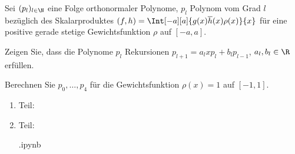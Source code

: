 
\begin{exercise}

Sei $(p_l)_{l \in \N}$ eine Folge orthonormaler Polynome, $p_l$ Polynom vom Grad $l$ bezüglich des Skalarproduktes $(f, h) = \Int[-a][a]{g(x) \overline h(x) \rho(x)}{x}$ für eine positive gerade stetige Gewichtsfunktion $\rho$ auf $[-a, a]$.

Zeigen Sie, dass die Polynome $p_l$ Rekursionen $p_{l+1} = a_l x p_l + b_l p_{l-1}$, $a_l, b_l \in \R$ erfüllen.

Berechnen Sie $p_0, \dots, p_4$ für die Gewichtsfunktion $\rho(x) = 1$ auf $[-1, 1]$.

\end{exercise}


\begin{solution}

\phantom{}

\begin{enumerate}[label = \arabic*.]

    \item Teil:

    \item Teil:

    .ipynb

\end{enumerate}

\end{solution}

